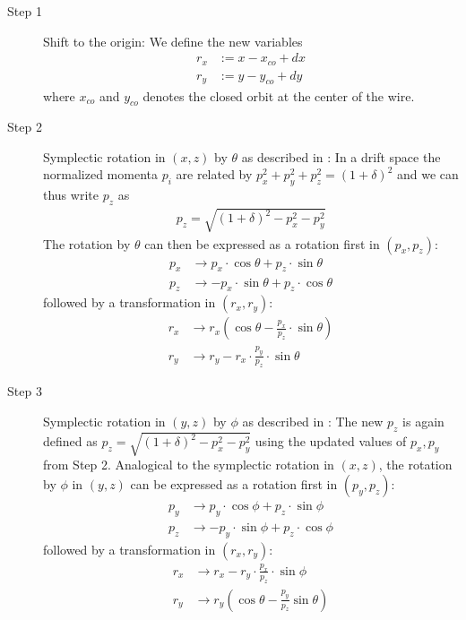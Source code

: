 \documentclass[english]{article}
\begin{document}
\begin{description}
\item[Step 1] Shift to the origin: We define the new variables
	\begin{align}
	r_x &:= x -x_{co}  + dx \nonumber\\
	r_y &:= y -y_{co} + dy
	\end{align}
where $x_{co}$ and $y_{co}$ denotes the closed orbit at the center of the wire.

\item[Step 2] Symplectic rotation in $(x,z)$ by $\theta$ as described in \cite{forest99}: In a drift space the normalized momenta $p_i$ are related by $p_x^2+p_y^2 +p_z^2=(1+\delta)^2$  and we can thus write $p_z$ as
\begin{align}
p_z = \sqrt{(1+\delta)^2-p_x^2-p_y^2}
\end{align}
The rotation by $\theta$ can then be expressed as a rotation first in $(p_x,p_z)$:
 \begin{align}
 p_x & \to   p_x \cdot \cos \theta + p_z \cdot \sin\theta \nonumber\\
 p_z & \to - p_x \cdot \sin \theta + p_z \cdot \cos\theta
 \end{align}
 followed by a transformation in $(r_x,r_y)$:
 \begin{align}
 r_x & \to r_x \left(\cos\theta - \frac{p_x}{p_z} \cdot \sin\theta\right)  \nonumber\\
 r_y & \to r_y - r_x \cdot\frac{p_y}{p_z}\cdot\sin\theta  
 \end{align}

\item[Step 3] Symplectic rotation in $(y,z)$ by $\phi$ as described in \cite{forest99}: The new $p_z$ is again defined as
$p_z = \sqrt{(1+\delta)^2-p_x^2-p_y^2}$ using the updated values of $p_x,p_y$ from Step 2. Analogical to the symplectic rotation in $(x,z)$, the rotation by $\phi$ in $(y,z)$ can be expressed as a rotation first in $(p_y,p_z)$:
\begin{align}
p_y & \to   p_y \cdot\cos \phi + p_z \cdot\sin\phi \nonumber\\
p_z & \to - p_y \cdot\sin \phi + p_z \cdot\cos\phi
\end{align}
followed by a transformation in $(r_x,r_y)$:
\begin{align}
r_x & \to r_x - r_y \cdot\frac{p_x}{p_z}\cdot\sin\phi \nonumber\\ 
r_y & \to r_y \left(\cos\theta - \frac{p_y}{p_z} \sin\theta\right)
\end{align}


\end{description}
\end{document}
